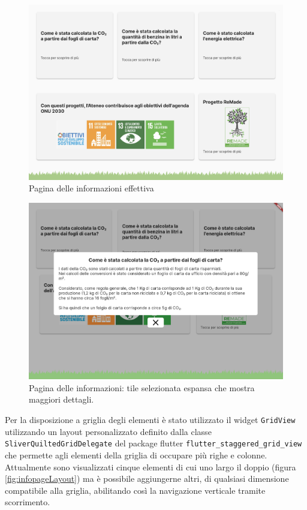 \begin{figure}
  \centering
  \includegraphics[width=\textwidth]{img/totem/screenshot/infoPageScreen.png}
  \caption{Pagina delle informazioni effettiva}
  \label{fig:infoPage}
\end{figure}
\begin{figure}
  \centering
  \includegraphics[width=\textwidth]{img/totem/screenshot/infoPagePopupScreen.png}
  \caption{Pagina delle informazioni: tile selezionata espansa che mostra maggiori dettagli.}
  \label{fig:infoPagePopup}
\end{figure}

Per la disposizione a griglia degli elementi è stato utilizzato il widget \texttt{GridView} utilizzando un layout personalizzato definito dalla classe \texttt{SliverQuiltedGridDelegate} del package flutter \texttt{flutter\_staggered\_grid\_view} \cite{staggeredGridView} che permette agli elementi della griglia di occupare più righe e colonne.
Attualmente sono visualizzati cinque elementi di cui uno largo il doppio (figura \ref{fig:infopageLayout}) ma è possibile aggiungerne altri, di qualsiasi dimensione compatibile alla griglia, abilitando così la navigazione verticale tramite scorrimento.


